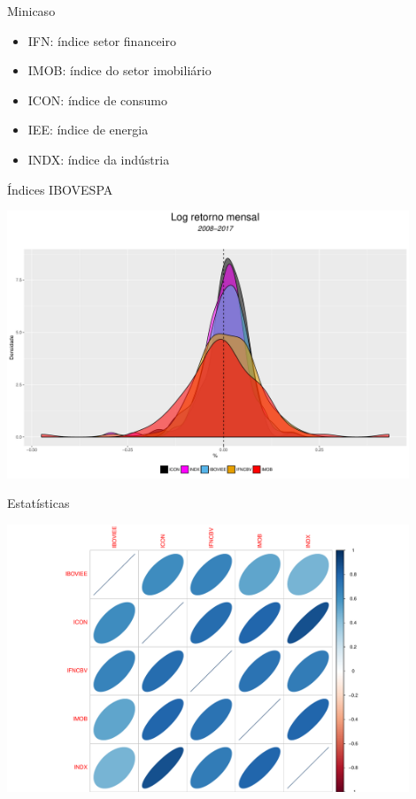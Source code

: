 \documentclass{beamer}
\begin{document}
\begin{frame}{Minicaso}

\begin{itemize}
  \item IFN:  índice setor financeiro
  \item IMOB: índice do setor imobiliário
  \item ICON: índice de consumo
  \item IEE:  índice de energia
  \item INDX: índice da indústria
\end{itemize}

\end{frame}

\begin{frame}{Índices  IBOVESPA}

\begin{center}
 \includegraphics[height=8cm,keepaspectratio]{decritiva_indices.pdf}
 \end{center}


\end{frame}


\begin{frame}{Estatísticas}

\begin{center}
 \includegraphics[height=8cm,keepaspectratio]{descritiva_cor.pdf}
 \end{center}


\end{frame}
\end{document}
